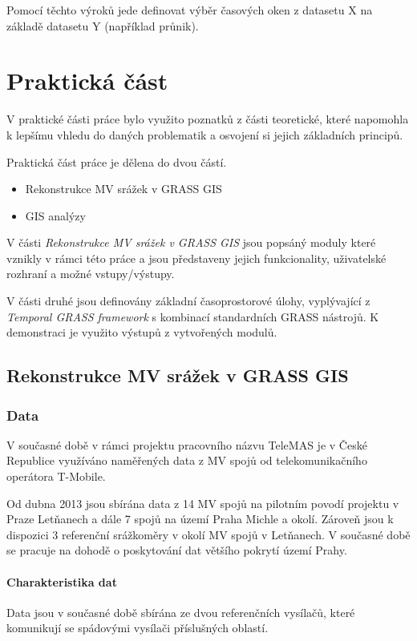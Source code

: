 \documentclass[a4paper,12pt,oneside]{report}
\begin{document}
Pomocí těchto výroků jede definovat výběr časových oken z datasetu X na základě datasetu Y (například průnik).




\newpage
\chapter*{Praktická část}

V praktické části práce bylo využito poznatků z části teoretické, které napomohla k lepšímu vhledu do daných problematik a osvojení si jejich základních principů. 

Praktická část práce je dělena do dvou částí.

\begin{itemize}
\item Rekonstrukce MV srážek v GRASS GIS
\item GIS analýzy
\end{itemize}


V části \textit{Rekonstrukce MV srážek v GRASS GIS} jsou popsáný moduly které vznikly v rámci této práce a jsou představeny jejich funkcionality, uživatelské rozhraní a  možné vstupy/výstupy.

V části druhé jsou definovány základní časoprostorové úlohy, vyplývající z \textit{Temporal GRASS framework} s kombinací standardních GRASS nástrojů. K demonstraci je využito výstupů z vytvořených modulů.

\section{Rekonstrukce MV srážek v GRASS GIS}

\subsection{Data}  
V současné době v rámci projektu pracovního názvu TeleMAS  je v České Republice  využíváno naměřených data z MV spojů od telekomunikačního operátora T-Mobile. 

Od dubna 2013 jsou sbírána data z 14 MV spojů na pilotním povodí projektu v Praze Letňanech a dále 7 spojů na území Praha Michle a okolí. Zároveň jsou k dispozici 3 referenční srážkoměry v okolí MV spojů v Letňanech.
V současné době se pracuje na dohodě o poskytování dat většího pokrytí území Prahy.

\subsubsection*{ Charakteristika dat} Data jsou v současné době sbírána ze dvou referenčních vysílačů, které komunikují se spádovými vysílači příslušných oblastí. 
\end{document}
